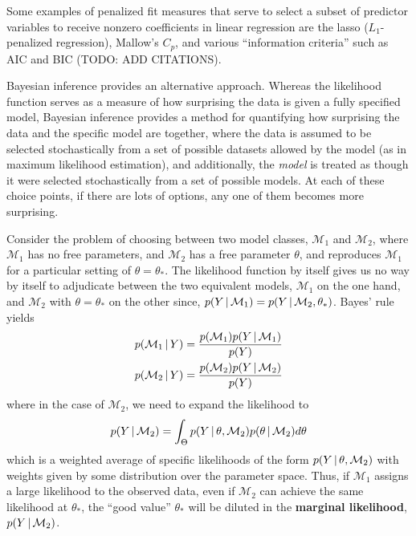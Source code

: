 Some examples of penalized fit measures that serve to select a subset
of predictor variables to receive nonzero coefficients in linear
regression are the lasso ($L_1$-penalized regression), Mallow's $C_p$,
and various ``information criteria'' such as AIC and BIC (TODO: ADD
CITATIONS).

Bayesian inference provides an alternative approach.  Whereas the
likelihood function serves as a measure of how surprising the data is given a fully
specified model, Bayesian inference provides a method for quantifying
how surprising the data and the specific model are together, where the
data is assumed to be selected stochastically from a set of possible
datasets allowed by the model (as in maximum likelihood estimation),
and additionally, the {\em model} is treated as though it were
selected stochastically from a set of possible models.  At each of
these choice points, if there are lots of options, any one of them
becomes more surprising.  

Consider the problem of choosing between two model
classes, $\mathcal{M}_1$ and $\mathcal{M}_2$, where $\mathcal{M}_1$
has no free parameters, and $\mathcal{M}_2$ has a free parameter
$\theta$, and reproduces $\mathcal{M}_1$ for a particular setting of
$\theta = \theta_*$.  The likelihood function by itself gives us no way by
itself to adjudicate between the two equivalent models,
$\mathcal{M}_1$ on the one hand, and $\mathcal{M}_2$ with $\theta =
\theta_*$ on the other since, $p(Y \, \vert \, \mathcal{M}_1) = p(Y
\, \vert \, \mathcal{M}_2, \theta_*)$.  Bayes' rule yields
\begin{align}
  p(\mathcal{M}_1 \, \vert \, Y)&= \frac{p(\mathcal{M}_1) p(Y \, \vert \,
    \mathcal{M}_1)}{p(Y)} \\
  p(\mathcal{M}_2 \, \vert \, Y)&= \frac{p(\mathcal{M}_2) p(Y \, \vert \, \mathcal{M}_2)}{p(Y)}
\end{align}
where in the case of $\mathcal{M}_2$, we need to expand the likelihood
to
\begin{equation}
  \label{eq:2}
  p(Y \, \vert \, \mathcal{M}_2) = \int_{\Theta} p(Y \, \vert \, \theta,
  \mathcal{M}_2) p(\theta \, \vert \, \mathcal{M}_2) d\theta
\end{equation}
which is a weighted average of specific likelihoods of the form $p(Y
\, \vert \, \theta, \mathcal{M}_2)$ with weights given by some distribution
over the parameter space.  Thus, if $\mathcal{M}_1$ assigns a large
likelihood to the observed data, even if $\mathcal{M}_2$ can achieve
the same likelihood at $\theta_*$, the ``good value'' $\theta_*$ will
be diluted in the {\bf marginal likelihood}, $p(Y
\, \vert \, \mathcal{M}_2)$.

